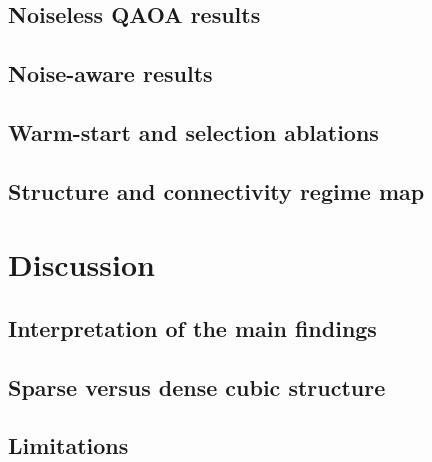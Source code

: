 \documentclass[a4paper,onecolumn,11pt,unpublished]{quantumarticle}
\newcommand{\blankcontent}{\noindent\mbox{}\par}
\theoremstyle{remark}
\begin{document}
\subsection{Noiseless QAOA results}
\blankcontent

\subsection{Noise-aware results}
\blankcontent

\subsection{Warm-start and selection ablations}
\blankcontent

\subsection{Structure and connectivity regime map}
\blankcontent

\section{Discussion}
\label{sec:discussion}

\subsection{Interpretation of the main findings}
\blankcontent

\subsection{Sparse versus dense cubic structure}

\subsection{Limitations}
\end{document}
